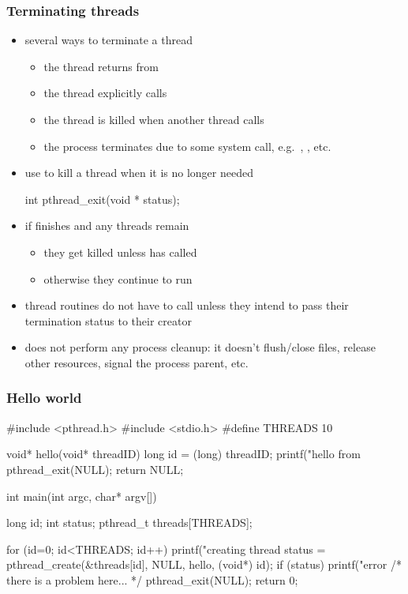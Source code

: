 \begin{frame}[fragile]
%
  \frametitle{Terminating threads}
%
  \begin{itemize}
%
    \item several ways to terminate a thread
      \begin{itemize}
      \item the thread returns from 
      \item the thread explicitly calls 
      \item the thread is killed when another thread calls 
      \item the process terminates due to some system call, e.g.~,
        , etc.
      \end{itemize}
%
  \item use  to kill a thread when it is no longer needed
%
    \begin{C}
int pthread_exit(void * status);
    \end{C}
%
  \item if  finishes and any threads remain
    \begin{itemize}
    \item they get killed unless  has called 
    \item otherwise they continue to run
    \end{itemize}
%
  \item thread routines do not have to call  unless they intend to pass
    their termination status to their creator
%
  \item {} does not perform any process cleanup: it doesn't flush/close
    files, release other resources, signal the process parent, etc.
  \end{itemize}
%
\end{frame}

\begin{frame}[fragile]
%
  \frametitle{Hello world}
  \label{slide:hello-world}
%
  \begin{C}
#include <pthread.h>
#include <stdio.h>
#define THREADS 10

void* hello(void* threadID) {
    long id = (long) threadID;
    printf("hello from %
    pthread_exit(NULL);
    return NULL;
}

int main(int argc, char* argv[]) {
    long id;
    int status;
    pthread_t threads[THREADS];

    for (id=0; id<THREADS; id++) {
        printf("creating thread %
        status = pthread_create(&threads[id], NULL, hello, (void*) id);
        if (status) {
            printf("error %
        }
    }
    /* there is a problem here... */
    pthread_exit(NULL);
    return 0;
}
  \end{C}
%
\end{frame}

